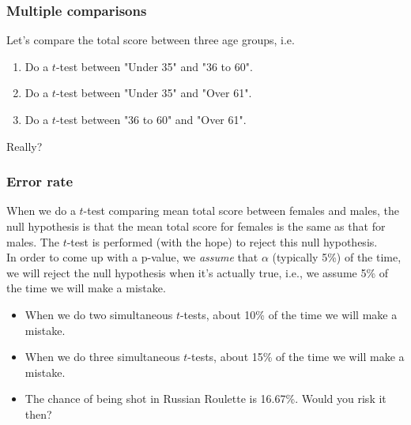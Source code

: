 \documentclass{beamer}\usepackage[]{graphicx}\usepackage[]{color}
\begin{document}
\begin{frame}[fragile]
\frametitle{Multiple comparisons}
Let's compare the total score between three age groups, i.e.
\begin{enumerate}
\item Do a $t$-test between "Under 35" and "36 to 60".
\item Do a $t$-test between "Under 35" and "Over 61".
\item Do a $t$-test between "36 to 60" and "Over 61".
\end{enumerate}
\begin{center}
\huge{Really?}
\end{center}
\end{frame}


\begin{frame}[fragile]
  \frametitle{Error rate}
When we do a $t$-test comparing mean total score between females and males, the null hypothesis is that the mean total score for females is the same as that for males. The $t$-test is performed (with the hope) to reject this null hypothesis.\\

In order to come up with a p-value, we \emph{assume} that $\alpha$
(typically 5\%) of the time, we will reject the null hypothesis when
it's actually true, i.e., we assume 5\% of the time we will make a mistake.

\begin{itemize}
\item When we do two simultaneous $t$-tests, about 10\% of the time we will make a mistake.
\item When we do three simultaneous $t$-tests, about 15\% of the time we will make a mistake.
\item The chance of being shot in Russian Roulette is 16.67\%. Would
  you risk it then?
\end{itemize}
\end{frame}
\end{document}
